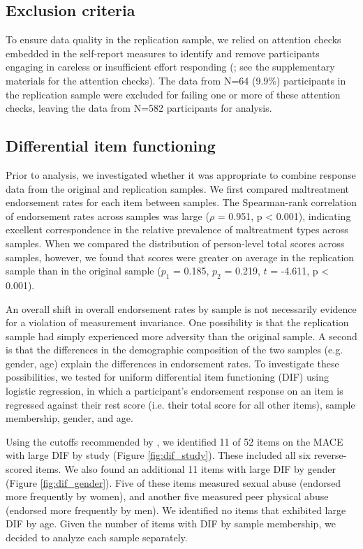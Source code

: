 \documentclass[letterpaper,man,natbib,floatsintext,longtable]{apa6}
\begin{document}
\subsection{Exclusion criteria}

To ensure data quality in the replication sample, we relied on attention checks embedded in the self-report measures to identify and remove participants engaging in careless or insufficient effort responding (\citealt{zorowitz2021inattentive}; see the supplementary materials for the attention checks). The data from N=64 (9.9\%)  participants in the replication sample were excluded for failing one or more of these attention checks, leaving the data from N=582 participants for analysis.

\subsection{Differential item functioning}

Prior to analysis, we investigated whether it was appropriate to combine response data from the original and replication samples. We first compared maltreatment endorsement rates for each item between samples. The Spearman-rank correlation of endorsement rates across samples was large ($\rho$ = 0.951, p < 0.001), indicating excellent correspondence in the relative prevalence of maltreatment types across samples. When we compared the distribution of person-level total scores across samples, however, we found that scores were greater on average in the replication sample than in the original sample ($p_1$ = 0.185, $p_2$ = 0.219, $t$ = -4.611, p < 0.001). 

An overall shift in overall endorsement rates by sample is not necessarily evidence for a violation of measurement invariance. One possibility is that the replication sample had simply experienced more adversity than the original sample. A second is that the differences in the demographic composition of the two samples (e.g. gender, age) explain the differences in endorsement rates. To investigate these possibilities, we tested for uniform differential item functioning (DIF) using logistic regression, in which a participant's endorsement response on an item is regressed against their rest score (i.e. their total score for all other items), sample membership, gender, and age.

Using the cutoffs recommended by \cite{hidalgo2014binary}, we identified 11 of 52 items on the MACE with large DIF by study (Figure \ref{fig:dif_study}). These included all six reverse-scored items. We also found an additional 11 items with large DIF by gender (Figure \ref{fig:dif_gender}). Five of these items measured sexual abuse (endorsed more frequently by women), and another five measured peer physical abuse (endorsed more frequently by men). We identified no items that exhibited large DIF by age. Given the number of items with DIF by sample membership, we decided to analyze each sample separately.
\end{document}
